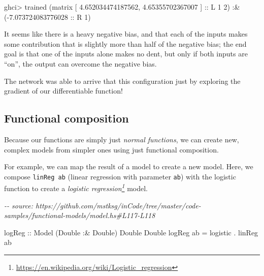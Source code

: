 \documentclass[]{article}
\newenvironment{Shaded}{}{}
\newcommand{\CommentTok}[1]{\textcolor[rgb]{0.38,0.63,0.69}{\textit{#1}}}
\newcommand{\DataTypeTok}[1]{\textcolor[rgb]{0.56,0.13,0.00}{#1}}
\newcommand{\DecValTok}[1]{\textcolor[rgb]{0.25,0.63,0.44}{#1}}
\newcommand{\FloatTok}[1]{\textcolor[rgb]{0.25,0.63,0.44}{#1}}
\newcommand{\NormalTok}[1]{#1}
\newcommand{\OperatorTok}[1]{\textcolor[rgb]{0.40,0.40,0.40}{#1}}
\newcommand{\OtherTok}[1]{\textcolor[rgb]{0.00,0.44,0.13}{#1}}
\renewcommand{\href}[2]{#2\footnote{\url{#1}}}
\begin{document}
\begin{Shaded}
\begin{Highlighting}[]
\NormalTok{ghci}\OperatorTok{\textgreater{}}\NormalTok{ trained}
\NormalTok{(matrix}
\NormalTok{ [ }\FloatTok{4.652034474187562}\NormalTok{, }\FloatTok{4.65355702367007}\NormalTok{ ]}\OtherTok{ ::} \DataTypeTok{L} \DecValTok{1} \DecValTok{2}\NormalTok{) }\OperatorTok{:\&}\NormalTok{ (}\OperatorTok{{-}}\FloatTok{7.073724083776028}\OtherTok{ ::} \DataTypeTok{R} \DecValTok{1}\NormalTok{)}
\end{Highlighting}
\end{Shaded}

It seems like there is a heavy negative bias, and that each of the inputs makes
some contribution that is slightly more than half of the negative bias; the end
goal is that one of the inputs alone makes no dent, but only if both inputs are
``on'', the output can overcome the negative bias.

The network was able to arrive that this configuration just by exploring the
gradient of our differentiable function!

\subsection{Functional composition}\label{functional-composition}

Because our functions are simply just \emph{normal functions}, we can create
new, complex models from simpler ones using just functional composition.

For example, we can map the result of a model to create a new model. Here, we
compose \texttt{linReg\ ab} (linear regression with parameter \texttt{ab}) with
the logistic function to create a
\emph{\href{https://en.wikipedia.org/wiki/Logistic_regression}{logistic
regression}} model.

\begin{Shaded}
\begin{Highlighting}[]
\CommentTok{{-}{-} source: https://github.com/mstksg/inCode/tree/master/code{-}samples/functional{-}models/model.hs\#L117{-}L118}

\OtherTok{logReg ::} \DataTypeTok{Model}\NormalTok{ (}\DataTypeTok{Double} \OperatorTok{:\&} \DataTypeTok{Double}\NormalTok{) }\DataTypeTok{Double} \DataTypeTok{Double}
\NormalTok{logReg ab }\OtherTok{=}\NormalTok{ logistic }\OperatorTok{.}\NormalTok{ linReg ab}
\end{Highlighting}
\end{Shaded}
\end{document}
